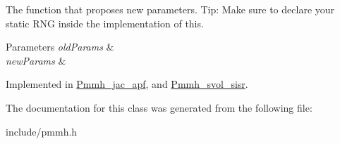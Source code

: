 The function that proposes new parameters. Tip\+: Make sure to declare your static R\+NG inside the implementation of this. 


\begin{DoxyParams}{Parameters}
{\em old\+Params} & \\
\hline
{\em new\+Params} & \\
\hline
\end{DoxyParams}


Implemented in \hyperlink{classPmmh__jac__apf_a0127e07b0f9ba6b042418c575b78ca55}{Pmmh\+\_\+jac\+\_\+apf}, and \hyperlink{classPmmh__svol__sisr_a18df26cb5c0bddefbd24866b1b4ff142}{Pmmh\+\_\+svol\+\_\+sisr}.



The documentation for this class was generated from the following file\+:\begin{DoxyCompactItemize}
\item 
include/pmmh.\+h\end{DoxyCompactItemize}
